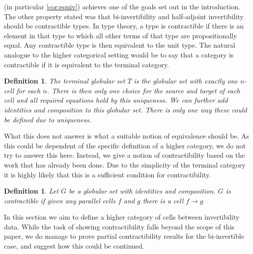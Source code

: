 \documentclass[draft]{article}
\newtheorem{definition}[theorem]{Definition} \theoremstyle{remark}
\begin{document}
 (in particular \cref{cor:equiv}) achieves one of the
goals set out in the introduction. The other property stated was that
bi-invertibility and half-adjoint invertibility should be contractible
types. In type theory, a type is contractible if there is an element
in that type to which all other terms of that type are propositionally
equal. Any contractible type is then equivalent to the unit type.
The natural analogue to the higher categorical setting would be to say
that a category is contractible if it is equivalent to the terminal
category.

\begin{definition}
  The \emph{terminal globular set} \(T\) is the globular set with exactly one
  \(n\)-cell for each \(n\). There is then only one choice for the
  source and target of each cell and all required equations hold by
  this uniqueness. We can further add identities and composition to
  this globular set. There is only one way these could be defined due
  to uniqueness.
\end{definition}

What this does not answer is what a suitable notion of equivalence
should be. As this could be dependent of the specific definition of a
higher category, we do not try to answer this here. Instead, we give a
notion of contractibility based on the work that has already been
done. Due to the simplicity of the terminal category it is highly
likely that this is a sufficient condition for contractibility.

\begin{definition}
  Let \(G\) be a globular set with identities and composition. \(G\)
  is \emph{contractible} if given any parallel cells \(f\) and \(g\)
  there is a cell \(f \to g\)
\end{definition}

In this section we aim to define a higher category of cells between
invertibility data. While the task of showing contractibility falls
beyond the scope of this paper, we do manage to prove partial
contractibility results for the bi-invertible case, and suggest how
this could be continued.
\end{document}
